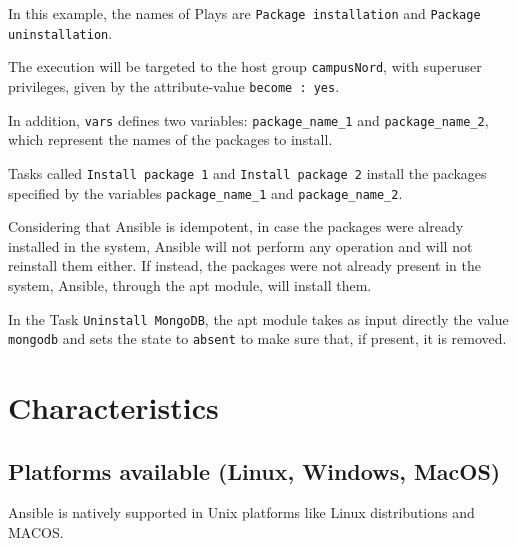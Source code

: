 \documentclass[12pt,a4paper,openright,twoside]{book}
\begin{document}


In this example, the names of Plays are \texttt{Package installation} and \texttt{Package uninstallation}.


The execution will be targeted to the host group \texttt{campusNord}, with superuser privileges, given by the attribute-value \texttt{become : yes}.


In addition, \texttt{vars} defines two variables: \texttt{package\_name\_1} and \texttt{package\_name\_2}, which represent the names of the packages to install.


Tasks called \texttt{Install package 1} and \texttt{Install package 2} install the packages specified by the variables \texttt{package\_name\_1} and \texttt{package\_name\_2}.


Considering that Ansible is idempotent, in case the packages were already installed in the system, Ansible will not perform any operation and will not reinstall them either. If instead, the packages were not already present in the system, Ansible, through the apt module, will install them.


In the Task \texttt{Uninstall MongoDB}, the apt module takes as input directly the value \texttt{mongodb} and sets the state to \texttt{absent} to make sure that, if present, it is removed.




\section{Characteristics}

\subsection{Platforms available (Linux, Windows, MacOS)}
Ansible is natively supported in Unix platforms like Linux distributions and MACOS.
\end{document}
